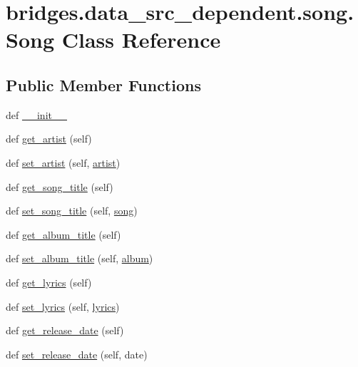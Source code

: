 \hypertarget{classbridges_1_1data__src__dependent_1_1song_1_1_song}{}\section{bridges.\+data\+\_\+src\+\_\+dependent.\+song.\+Song Class Reference}
\label{classbridges_1_1data__src__dependent_1_1song_1_1_song}
\subsection*{Public Member Functions}
\begin{DoxyCompactItemize}
\item 
def \mbox{\hyperlink{classbridges_1_1data__src__dependent_1_1song_1_1_song_a7f7384595782d5a3a829aa9f96a92845}{\+\_\+\+\_\+init\+\_\+\+\_\+}}
\item 
def \mbox{\hyperlink{classbridges_1_1data__src__dependent_1_1song_1_1_song_a2458e252968eea0eeb39dc5d5abffdbc}{get\+\_\+artist}} (self)
\item 
def \mbox{\hyperlink{classbridges_1_1data__src__dependent_1_1song_1_1_song_a9be923491f4010ad0036949a9a06e382}{set\+\_\+artist}} (self, \mbox{\hyperlink{classbridges_1_1data__src__dependent_1_1song_1_1_song_a0581174b3d8a941ae22816c8bc3a273d}{artist}})
\item 
def \mbox{\hyperlink{classbridges_1_1data__src__dependent_1_1song_1_1_song_a66c61ba988dac4b4ac17a07ae269c596}{get\+\_\+song\+\_\+title}} (self)
\item 
def \mbox{\hyperlink{classbridges_1_1data__src__dependent_1_1song_1_1_song_a825b62e941e43fa9dbd811f4401bfefa}{set\+\_\+song\+\_\+title}} (self, \mbox{\hyperlink{classbridges_1_1data__src__dependent_1_1song_1_1_song_a6bd4c03cfdb41aef1dea920df267f53a}{song}})
\item 
def \mbox{\hyperlink{classbridges_1_1data__src__dependent_1_1song_1_1_song_a8237b4a534991379a7130976e06a7a3e}{get\+\_\+album\+\_\+title}} (self)
\item 
def \mbox{\hyperlink{classbridges_1_1data__src__dependent_1_1song_1_1_song_a8b0246061eee5439c0e08e6ebb3249b5}{set\+\_\+album\+\_\+title}} (self, \mbox{\hyperlink{classbridges_1_1data__src__dependent_1_1song_1_1_song_a1c5b98e4e8c10a0bdc44ddff84d3f5ed}{album}})
\item 
def \mbox{\hyperlink{classbridges_1_1data__src__dependent_1_1song_1_1_song_a5de19888bbe561f4e1522be24d963cfe}{get\+\_\+lyrics}} (self)
\item 
def \mbox{\hyperlink{classbridges_1_1data__src__dependent_1_1song_1_1_song_ac6cb134a1f5fcd8f77c4f82031857dd4}{set\+\_\+lyrics}} (self, \mbox{\hyperlink{classbridges_1_1data__src__dependent_1_1song_1_1_song_a6e187df41c7719fab7feb91dad22618f}{lyrics}})
\item 
def \mbox{\hyperlink{classbridges_1_1data__src__dependent_1_1song_1_1_song_a9f5ab29651f29c73c82bc03e437959f4}{get\+\_\+release\+\_\+date}} (self)
\item 
def \mbox{\hyperlink{classbridges_1_1data__src__dependent_1_1song_1_1_song_a612d23368e5f222a2f4c5aca28dad224}{set\+\_\+release\+\_\+date}} (self, date)
\end{DoxyCompactItemize}
